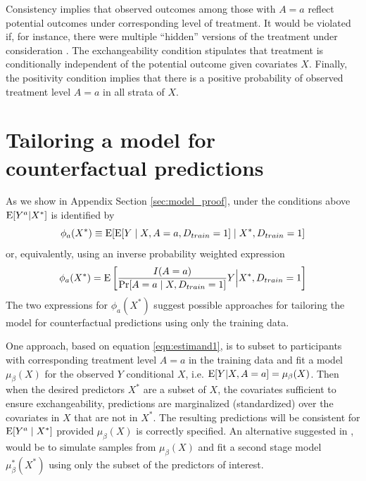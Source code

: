 Consistency implies that observed outcomes among those with $A = a$ reflect potential outcomes under corresponding level of treatment. It would be violated if, for instance, there were multiple ``hidden'' versions of the treatment under consideration \cite{rubin_randomization_1980}. The exchangeability condition stipulates that treatment is conditionally independent of the potential outcome given covariates $X$. Finally, the positivity condition implies that there is a positive probability of observed treatment level $A = a$ in all strata of $X$.  

\section{Tailoring a model for counterfactual predictions} \label{sec:model}

As we show in Appendix Section \ref{sec:model_proof}, under the conditions above $\operatorname{E}[Y^a | X^*]$ is identified by
\begin{equation}\label{eqn:estimand1}
    \phi_a(X^*) \equiv \operatorname{E}[\operatorname{E}[Y \mid X, A = a, D_{train} = 1] \mid X^*, D_{train} = 1]
\end{equation}
or, equivalently, using an inverse probability weighted expression 
\begin{equation}\label{eqn:estimand2}
    \phi_a(X^*) = \operatorname{E}\left[\frac{I(A = a)}{\Pr[A = a \mid X, D_{train} = 1]} Y \Big| X^*, D_{train} = 1\right]
\end{equation}
The two expressions for $\phi_a(X^*)$ suggest possible approaches for tailoring the model for counterfactual predictions using only the training data. 

One approach, based on equation \ref{eqn:estimand1}, is to subset to participants with corresponding treatment level $A = a$ in the training data and fit a model $\mu_\beta(X)$ for the observed $Y$ conditional $X$, i.e. $\operatorname{E}[Y | X, A = a] = \mu_\beta(X)$. Then when the desired predictors $X^*$ are a subset of $X$, the covariates sufficient to ensure exchangeability,  predictions are marginalized (standardized) over the covariates in $X$ that are not in $X^*$. The resulting predictions will be consistent for $\operatorname{E}[Y^a \mid X^*]$ provided $\mu_\beta(X)$ is correctly specified. An alternative suggested in \cite{dickerman_predicting_2022}, would be to simulate samples from $\mu_\beta(X)$ and fit a second stage model $\mu^*_\beta(X^*)$ using only the subset of the predictors of interest.  

